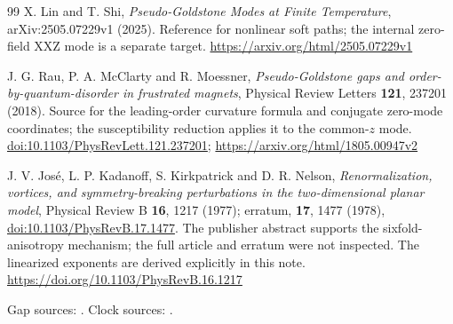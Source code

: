 \begin{thebibliography}{99}
X. Lin and T. Shi, \emph{Pseudo-Goldstone Modes at Finite Temperature}, arXiv:2505.07229v1 (2025). Reference for nonlinear soft paths; the internal zero-field XXZ mode is a separate target.
\url{https://arxiv.org/html/2505.07229v1}

J. G. Rau, P. A. McClarty and R. Moessner, \emph{Pseudo-Goldstone gaps and order-by-quantum-disorder in frustrated magnets}, Physical Review Letters \textbf{121}, 237201 (2018). Source for the leading-order curvature formula and conjugate zero-mode coordinates; the susceptibility reduction applies it to the common-$z$ mode.
\href{https://doi.org/10.1103/PhysRevLett.121.237201}{doi:10.1103/PhysRevLett.121.237201};
\url{https://arxiv.org/html/1805.00947v2}

J. V. Jos\'{e}, L. P. Kadanoff, S. Kirkpatrick and D. R. Nelson, \emph{Renormalization, vortices, and symmetry-breaking perturbations in the two-dimensional planar model}, Physical Review B \textbf{16}, 1217 (1977); erratum, \textbf{17}, 1477 (1978), \href{https://doi.org/10.1103/PhysRevB.17.1477}{doi:10.1103/PhysRevB.17.1477}. The publisher abstract supports the sixfold-anisotropy mechanism; the full article and erratum were not inspected. The linearized exponents are derived explicitly in this note.
\url{https://doi.org/10.1103/PhysRevB.16.1217}

\end{thebibliography}

\label{sources-for-the-gap-analysis}
Gap sources: \cite{park2026,rau2018,lin2025}.
\label{sources-for-the-clock-analysis}
Clock sources: \cite{chen2017,park2026,jose1977}.
